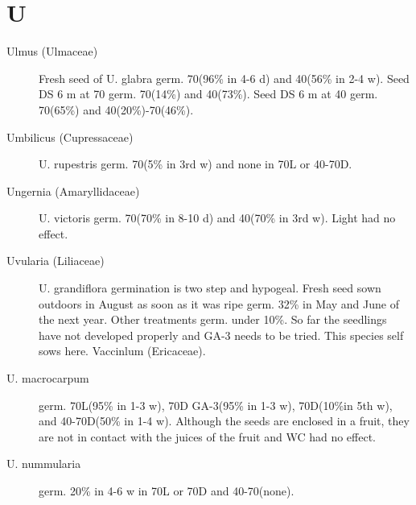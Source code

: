 \section{U}
\begin{description}

\item[Ulmus (Ulmaceae)] Fresh seed of U. glabra germ. 70(96\% in 4-6 d) and
40(56\% in 2-4 w). Seed DS 6 m at 70 germ. 70(14\%) and 40(73\%). Seed DS 6 m at
40 germ. 70(65\%) and 40(20\%)-70(46\%).
\item[Umbilicus (Cupressaceae)] U. rupestris germ. 70(5\% in 3rd w) and none
in 70L or 40-70D.
\item[Ungernia (Amaryllidaceae)] U. victoris germ. 70(70\% in 8-10 d) and
40(70\% in 3rd w). Light had no effect.
\item[Uvularia (Liliaceae)] U. grandiflora germination is two step and hypogeal.
Fresh seed sown outdoors in August as soon as it was ripe germ. 32\% in May and
June of the next year. Other treatments germ. under 10\%. So far the seedlings have
not developed properly and GA-3 needs to be tried. This species self sows here.
Vaccinlum (Ericaceae).
\item[U. macrocarpum] germ. 70L(95\% in 1-3 w), 70D GA-3(95\% in 1-3 w),
70D(10\%in 5th w), and 40-70D(50\% in 1-4 w). Although the seeds are enclosed in a
fruit, they are not in contact with the juices of the fruit and WC had no effect.
\item[U. nummularia] germ. 20\% in 4-6 w in 70L or 70D and 40-70(none).

\end{description}
